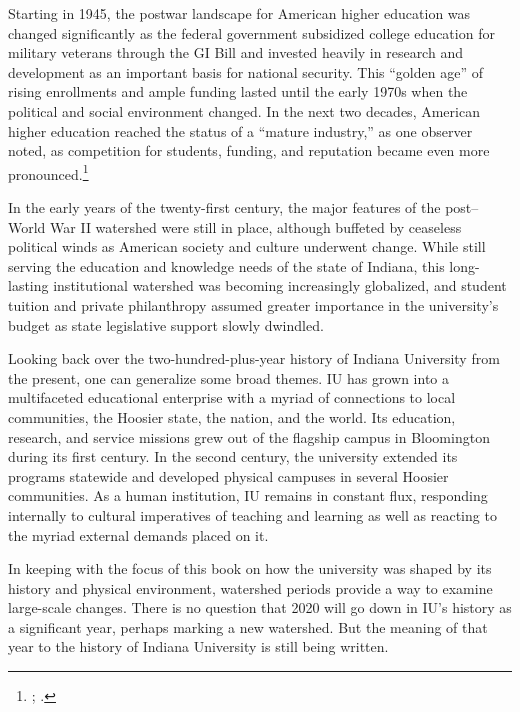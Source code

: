 \documentclass[
  american,
  letterpaper,
]{scrreprt}
\begin{document}
Starting in 1945, the postwar landscape for American higher education
was changed significantly as the federal government subsidized college
education for military veterans through the GI Bill and invested heavily
in research and development as an important basis for national security.
This ``golden age'' of rising enrollments and ample funding lasted until
the early 1970s when the political and social environment changed. In
the next two decades, American higher education reached the status of a
``mature industry,'' as one observer noted, as competition for students,
funding, and reputation became even more pronounced.\footnote{; .}

In the early years of the twenty-first century, the major features of
the post--World War II watershed were still in place, although buffeted
by ceaseless political winds as American society and culture underwent
change. While still serving the education and knowledge needs of the
state of Indiana, this long-lasting institutional watershed was becoming
increasingly globalized, and student tuition and private philanthropy
assumed greater importance in the university's budget as state
legislative support slowly dwindled.

Looking back over the two-hundred-plus-year history of Indiana
University from the present, one can generalize some broad themes. IU
has grown into a multifaceted educational enterprise with a myriad of
connections to local communities, the Hoosier state, the nation, and the
world. Its education, research, and service missions grew out of the
flagship campus in Bloomington during its first century. In the second
century, the university extended its programs statewide and developed
physical campuses in several Hoosier communities. As a human
institution, IU remains in constant flux, responding internally to
cultural imperatives of teaching and learning as well as reacting to the
myriad external demands placed on it.

In keeping with the focus of this book on how the university was shaped
by its history and physical environment, watershed periods provide a way
to examine large-scale changes. There is no question that 2020 will go
down in IU's history as a significant year, perhaps marking a new
watershed. But the meaning of that year to the history of Indiana
University is still being written.
\end{document}
